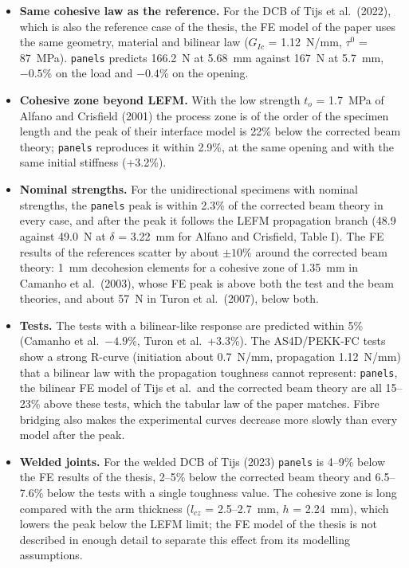 \begin{itemize}
	\item \textbf{Same cohesive law as the reference.} For the DCB of Tijs et al.\ (2022), which is also the reference case of the thesis, the FE model of the paper uses the same geometry, material and bilinear law ($G_{Ic}$ = 1.12~N/mm, $\tau^0$ = 87~MPa). \texttt{panels} predicts 166.2~N at 5.68~mm against 167~N at 5.7~mm, $-0.5$\% on the load and $-0.4$\% on the opening.
	\item \textbf{Cohesive zone beyond LEFM.} With the low strength $t_o$ = 1.7~MPa of Alfano and Crisfield (2001) the process zone is of the order of the specimen length and the peak of their interface model is 22\% below the corrected beam theory; \texttt{panels} reproduces it within 2.9\%, at the same opening and with the same initial stiffness (+3.2\%).
	\item \textbf{Nominal strengths.} For the unidirectional specimens with nominal strengths, the \texttt{panels} peak is within 2.3\% of the corrected beam theory in every case, and after the peak it follows the LEFM propagation branch (48.9 against 49.0~N at $\delta$ = 3.22~mm for Alfano and Crisfield, Table I). The FE results of the references scatter by about $\pm 10$\% around the corrected beam theory: 1~mm decohesion elements for a cohesive zone of 1.35~mm in Camanho et al.\ (2003), whose FE peak is above both the test and the beam theories, and about 57~N in Turon et al.\ (2007), below both.
	\item \textbf{Tests.} The tests with a bilinear-like response are predicted within 5\% (Camanho et al.\ $-4.9$\%, Turon et al.\ +3.3\%). The AS4D/PEKK-FC tests show a strong R-curve (initiation about 0.7~N/mm, propagation 1.12~N/mm) that a bilinear law with the propagation toughness cannot represent: \texttt{panels}, the bilinear FE model of Tijs et al.\ and the corrected beam theory are all 15--23\% above these tests, which the tabular law of the paper matches. Fibre bridging also makes the experimental curves decrease more slowly than every model after the peak.
	\item \textbf{Welded joints.} For the welded DCB of Tijs (2023) \texttt{panels} is 4--9\% below the FE results of the thesis, 2--5\% below the corrected beam theory and 6.5--7.6\% below the tests with a single toughness value. The cohesive zone is long compared with the arm thickness ($l_{cz}$ = 2.5--2.7~mm, $h$ = 2.24~mm), which lowers the peak below the LEFM limit; the FE model of the thesis is not described in enough detail to separate this effect from its modelling assumptions.

\end{itemize}
